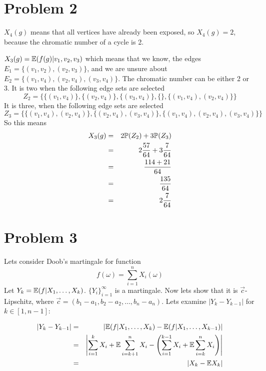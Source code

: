 \documentclass[a4paper]{article}
\begin{document}
\section*{Problem 2}

$ X_4(g) $ means that all vertices have already been exposed, so $ X_4(g)
= 2 $, because the chromatic number of a cycle is 2.

$ X_3(g) = \E(f(g) | v_1, v_2, v_3)$ which means that we know, the edges $ E_1
= \{ (v_1, v_2), (v_2, v_3) \} $, and we are unsure about $ E_2 = \{ (v_1,
v_4), (v_2, v_4), (v_3, v_4) \} $. The chromatic number can be either 2 or 3.
It is two when the following edge sets are selected \[ Z_2 = \{ \{ (v_1, v_4)
\}, \{ (v_2, v_4) \}, \{ (v_3, v_4) \}, \{ \}, \{ (v_1, v_4), (v_2, v_4) \} \}
\] It is three, when the following edge sets are selected \[ Z_3 = \{ \{ (v_1,
v_4), (v_2, v_4) \}, \{ (v_2, v_4), (v_3, v_4) \}, \{ (v_1, v_4), (v_2, v_4),
(v_3, v_4) \} \} \] So this means
\begin{eqnarray*}
X_3(g)
  &=& 2\P(Z_2) + 3 \P(Z_3) \\
  &=& 2 \frac{57}{64} + 3\frac{7}{64} \\
  &=& \frac{114 + 21}{64} \\
  &=& \frac{135}{64} \\
  &=& 2 \frac{7}{64} \\
\end{eqnarray*}

\section*{Problem 3}

Lets consider Doob's martingale for function \[ f(\omega) = \sum_{i=1}^{n}
X_i(\omega) \] Let $ Y_k = \E(f | X_1, \dots, X_k) $. $ \{ Y_i
\}_{i=1}^{\infty} $ is a martingale. Now lets show that it is $ \vec
c $-Lipschitz, where $ \vec c = (b_1 - a_1, b_2 - a_2, \dots, b_n - a_n) $.
Lets examine $ |Y_{k} - Y_{k-1}| $ for $ k \in [1, n-1] $:

\begin{eqnarray*}
\left|Y_{k} - Y_{k-1}\right|
  &=& \left|\E(f | X_1, \dots, X_{k})
    - \E(f | X_1, \dots, X_{k-1}) \right| \\
  &=& \left|\sum_{i=1}^{k} X_i + \E\sum_{i=k+1}^{n} X_i
    - \B{\sum_{i=1}^{k-1} X_i + \E\sum_{i=k}^{n} X_i} \right| \\
  &=& |X_{k} - \E X_{k}| \\
\end{eqnarray*}
\end{document}
